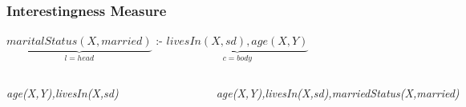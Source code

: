 \documentclass{beamer}
\begin{document}
\begin{frame}
\frametitle{Interestingness Measure}
    \begin{center}
      $\underbrace{maritalStatus(X,married)}_{l=head}$ :- $\underbrace{livesIn(X,sd),age(X,Y)}_{c=body}$
    \end{center}
    
     \begin{columns}[c]
	  \center \tiny \emph{age(X,Y),livesIn(X,sd)}
	  \begin{figure}
	    \includegraphics[width=1\linewidth]{./Figures/age-dist-southdakota.png}
	  \end{figure}
	  \center \tiny \emph{age(X,Y),livesIn(X,sd),marriedStatus(X,married)}
	  \begin{figure}
	    \includegraphics[width=1\linewidth]{./Figures/age-dist-southdakota-married.png}
	  \end{figure}  
     \end{columns}
\end{frame}
\end{document}
